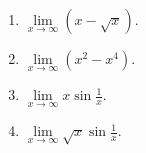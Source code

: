 \begin{problem}
\begin{multicols}{3}
\begin{enumerate}
\answer{$\infty$}
\item $\lim\limits_{x\to\infty}(x-\sqrt{x})$.

\answer{$\infty$}
\item $\lim\limits_{x\to\infty}(x^2-x^4)$.

\answer{$-\infty$}
\item $\lim\limits_{x\to\infty}x\sin \frac{1}{x}$.

\item $\lim\limits_{x\to\infty}\sqrt{x}\sin \frac{1}{x}$.

\end{enumerate}
\end{multicols}
\end{problem}